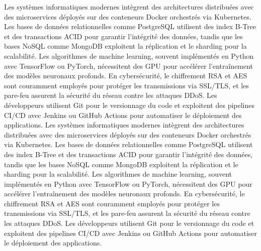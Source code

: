 Les systèmes informatiques modernes intègrent des architectures distribuées avec des microservices déployés sur des conteneurs Docker orchestrés via Kubernetes. Les bases de données relationnelles comme PostgreSQL utilisent des index B-Tree et des transactions ACID pour garantir l'intégrité des données, tandis que les bases NoSQL comme MongoDB exploitent la réplication et le sharding pour la scalabilité. Les algorithmes de machine learning, souvent implémentés en Python avec TensorFlow ou PyTorch, nécessitent des GPU pour accélérer l'entraînement des modèles neuronaux profonds. En cybersécurité, le chiffrement RSA et AES sont couramment employés pour protéger les transmissions via SSL/TLS, et les pare-feu assurent la sécurité du réseau contre les attaques DDoS. Les développeurs utilisent Git pour le versionnage du code et exploitent des pipelines CI/CD avec Jenkins ou GitHub Actions pour automatiser le déploiement des applications.
Les systèmes informatiques modernes intègrent des architectures distribuées avec des microservices déployés sur des conteneurs Docker orchestrés via Kubernetes. Les bases de données relationnelles comme PostgreSQL utilisent des index B-Tree et des transactions ACID pour garantir l'intégrité des données, tandis que les bases NoSQL comme MongoDB exploitent la réplication et le sharding pour la scalabilité. Les algorithmes de machine learning, souvent implémentés en Python avec TensorFlow ou PyTorch, nécessitent des GPU pour accélérer l'entraînement des modèles neuronaux profonds. En cybersécurité, le chiffrement RSA et AES sont couramment employés pour protéger les transmissions via SSL/TLS, et les pare-feu assurent la sécurité du réseau contre les attaques DDoS. Les développeurs utilisent Git pour le versionnage du code et exploitent des pipelines CI/CD avec Jenkins ou GitHub Actions pour automatiser le déploiement des applications.
